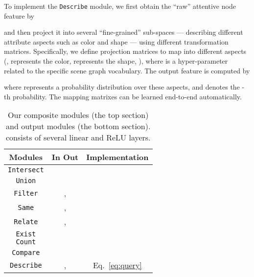 \documentclass[10pt,twocolumn,letterpaper]{article}
\begin{document}
To implement the \texttt{Describe} module, we first obtain the ``raw'' attentive node feature by
\vspace{-0.2cm}

and then project it into several ``fine-grained'' sub-spaces --- describing different attribute aspects such as color and shape --- using different transformation matrices. 
Specifically, we define  projection matrices  to map  into different aspects (\eg,  represents the color,  represents the shape, \etc), where  is a hyper-parameter related to the specific scene graph vocabulary.
The output feature is computed by
\vspace{-0.2cm}

where  represents a probability distribution over these  aspects, and  denotes the -th probability.
The mapping matrixes can be learned end-to-end automatically.


\begin{table}[h]
    \caption{Our composite modules (the top section) and output modules (the bottom section).  consists of several linear and ReLU layers.}
    \centering
    \footnotesize
    \begin{tabular}{|c|c|c|}
    \hline
    Modules & In  Out & Implementation \\
    \hline
    \texttt{Intersect}    &        &  \\
    \texttt{Union}     &           &  \\
    \texttt{Filter}     & ,      &  \\
    \texttt{Same}       & ,      & {\fontsize{7}{7}\selectfont } \\
    \texttt{Relate}     & ,      & {\fontsize{7.7}{7.7}\selectfont } \\
    \hline
    \hline
    \specialcell[c]{\texttt{Exist} \\ \texttt{Count}}     & 	       & \\
    \texttt{Compare}     &     &  \\
    \texttt{Describe}  & ,     & Eq.~\eqref{eq:query}\\
    
    \hline
    \end{tabular}
    \label{tab:modules}
\vspace{-0.4cm}
\end{table}
\end{document}
